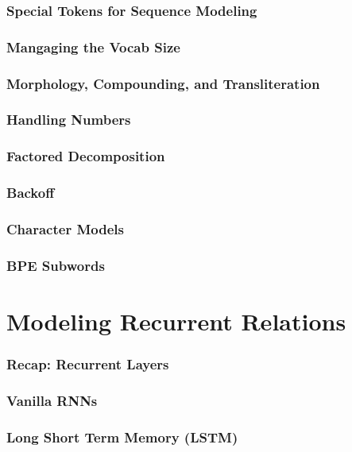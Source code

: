 \documentclass{beamer}
\begin{document}
\begin{frame}
\frametitle{Special Tokens for Sequence Modeling}

\end{frame}

\begin{frame}
\frametitle{Mangaging the Vocab Size}

\end{frame}

\begin{frame}
\frametitle{Morphology, Compounding, and Transliteration}

\end{frame}

\begin{frame}
\frametitle{Handling Numbers}

\end{frame}

\begin{frame}
\frametitle{Factored Decomposition}

\end{frame}

\begin{frame}
\frametitle{Backoff}

\end{frame}

\begin{frame}
\frametitle{Character Models}

\end{frame}

\begin{frame}
\frametitle{BPE Subwords}

\end{frame}


\section{Modeling Recurrent Relations}

\begin{frame}
\frametitle{Recap: Recurrent Layers}

\end{frame}

\begin{frame}
\frametitle{Vanilla RNNs}

\end{frame}

\begin{frame}
\frametitle{Long Short Term Memory (LSTM)}

\end{frame}
\end{document}
